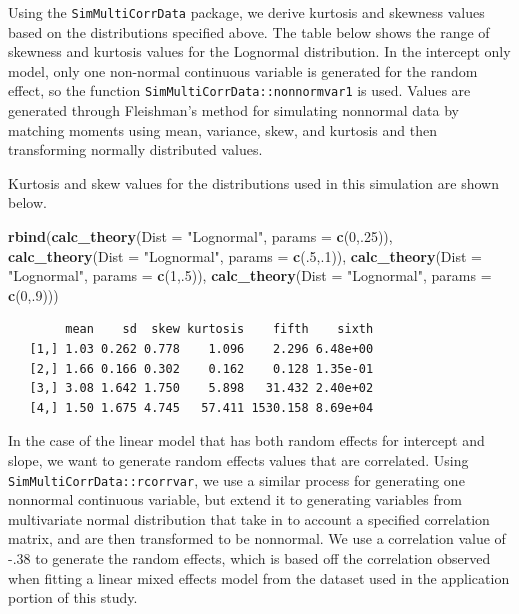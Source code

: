 \documentclass[12pt, twoside]{amherstthesis}
\newenvironment{Shaded}{\begin{snugshade}}{\end{snugshade}}
\newcommand{\DataTypeTok}[1]{\textcolor[rgb]{0.13,0.29,0.53}{#1}}
\newcommand{\DecValTok}[1]{\textcolor[rgb]{0.00,0.00,0.81}{#1}}
\newcommand{\KeywordTok}[1]{\textcolor[rgb]{0.13,0.29,0.53}{\textbf{#1}}}
\newcommand{\NormalTok}[1]{#1}
\newcommand{\StringTok}[1]{\textcolor[rgb]{0.31,0.60,0.02}{#1}}
\begin{document}
Using the \texttt{SimMultiCorrData} package, we derive kurtosis and skewness values based on the distributions specified above. The table below shows the range of skewness and kurtosis values for the Lognormal distribution. In the intercept only model, only one non-normal continuous variable is generated for the random effect, so the function \texttt{SimMultiCorrData::nonnormvar1} is used. Values are generated through Fleishman's method for simulating nonnormal data by matching moments using mean, variance, skew, and kurtosis and then transforming normally distributed values.

Kurtosis and skew values for the distributions used in this simulation are shown below.
\begin{Shaded}
\begin{Highlighting}[]
\KeywordTok{rbind}\NormalTok{(}\KeywordTok{calc_theory}\NormalTok{(}\DataTypeTok{Dist =} \StringTok{"Lognormal"}\NormalTok{, }\DataTypeTok{params =} \KeywordTok{c}\NormalTok{(}\DecValTok{0}\NormalTok{,.}\DecValTok{25}\NormalTok{)),}
      \KeywordTok{calc_theory}\NormalTok{(}\DataTypeTok{Dist =} \StringTok{"Lognormal"}\NormalTok{, }\DataTypeTok{params =} \KeywordTok{c}\NormalTok{(.}\DecValTok{5}\NormalTok{,.}\DecValTok{1}\NormalTok{)),}
      \KeywordTok{calc_theory}\NormalTok{(}\DataTypeTok{Dist =} \StringTok{"Lognormal"}\NormalTok{, }\DataTypeTok{params =} \KeywordTok{c}\NormalTok{(}\DecValTok{1}\NormalTok{,.}\DecValTok{5}\NormalTok{)),}
      \KeywordTok{calc_theory}\NormalTok{(}\DataTypeTok{Dist =} \StringTok{"Lognormal"}\NormalTok{, }\DataTypeTok{params =} \KeywordTok{c}\NormalTok{(}\DecValTok{0}\NormalTok{,.}\DecValTok{9}\NormalTok{)))}
\end{Highlighting}
\end{Shaded}
\begin{verbatim}
        mean    sd  skew kurtosis    fifth    sixth
   [1,] 1.03 0.262 0.778    1.096    2.296 6.48e+00
   [2,] 1.66 0.166 0.302    0.162    0.128 1.35e-01
   [3,] 3.08 1.642 1.750    5.898   31.432 2.40e+02
   [4,] 1.50 1.675 4.745   57.411 1530.158 8.69e+04
\end{verbatim}
In the case of the linear model that has both random effects for intercept and slope, we want to generate random effects values that are correlated. Using \texttt{SimMultiCorrData::rcorrvar}, we use a similar process for generating one nonnormal continuous variable, but extend it to generating variables from multivariate normal distribution that take in to account a specified correlation matrix, and are then transformed to be nonnormal. We use a correlation value of -.38 to generate the random effects, which is based off the correlation observed when fitting a linear mixed effects model from the dataset used in the application portion of this study.
\end{document}

